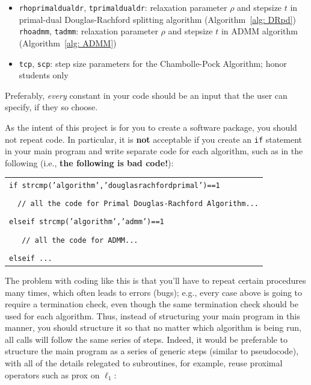 \documentclass[12pt]{article}
\begin{document}
\begin{itemize}
\begin{itemize}
     \item \texttt{rhoprimaldualdr}, \texttt{tprimaldualdr}: relaxation parameter $\rho$ and stepsize $t$ in primal-dual Douglas-Rachford splitting algorithm (Algorithm~\ref{alg: DRpd})
    \texttt{rhoadmm}, \texttt{tadmm}: relaxation parameter $\rho$ and stepsize $t$ in ADMM algorithm (Algorithm~\ref{alg: ADMM})
    \item \texttt{tcp}, \texttt{scp}: step size parameters for the Chambolle-Pock Algorithm;  honor students only
\end{itemize}
  Preferably, \emph{every} constant in your code should be an input that the user can specify, if they so choose.
\end{itemize}

As the intent of this project is for you to create a software package, you should not repeat code.  In particular, it is \textbf{not} acceptable if you create an \texttt{if} statement in your main program and write separate code for each algorithm, such as in the following (i.e., \textbf{the following is bad code!}):
\begin{center}
  \begin{tabular}{l}
    \texttt{if strcmp('algorithm','douglasrachfordprimal')==1}\\
    \\
    \ \ \texttt{// all the code for Primal Douglas-Rachford Algorithm...}\\
    \\
    \texttt{elseif strcmp('algorithm','admm')==1}\\
    \\
    \ \ \texttt{  // all the code for ADMM...}\\
    \\
    \texttt{elseif ...}
  \end{tabular}
\end{center}
The problem with coding like this is that you'll have to repeat certain procedures many times, which often leads to errors (bugs); e.g., every case above is going to require a termination check, even though the same termination check should be used for each algorithm.  Thus, instead of structuring your main program in this manner, you should structure it so that no matter which algorithm is being run, all calls will follow the same series of steps.  Indeed, it would be preferable to structure the main program as a series of generic steps (similar to pseudocode), with all of the details relegated to subroutines, for example, reuse proximal operators such as prox on $\ell_1$:
\end{document}
